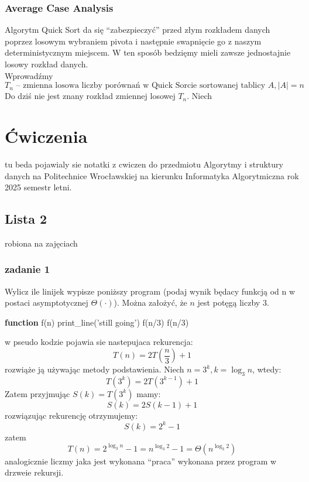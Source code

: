 \documentclass[11pt,a4paper]{article}
\begin{document}
\subsubsection{Average Case Analysis}
Algorytm Quick Sort da się ``zabezpieczyć'' przed złym rozkładem danych poprzez losowym wybraniem pivota i następnie swapnięcie go z naszym deterministycznym miejscem. W ten sposób bedzięmy mieli zawsze jednostajnie losowy rozkład danych.\\
Wprowadźmy
\[
    T_n  \text{ -- zmienna losowa liczby porównań w Quick Sorcie sortowanej tablicy } A, |A|=n
\]
Do dziś nie jest znany rozkład zmiennej losowej $T_n$.
Niech




\section{Ćwiczenia}
tu beda pojawialy sie notatki z cwiczen do przedmiotu Algorytmy i struktury danych na Politechnice Wrocławskiej na kierunku Informatyka Algorytmiczna rok 2025 semestr letni.

\subsection{Lista 2}
robiona na zajęciach \date{2025-03-10}
\subsubsection{zadanie 1}
Wylicz ile linijek wypisze poniższy program (podaj wynik będacy funkcją od n w postaci asymptotycznej $\Theta(\cdot)$). Można założyć, że $n$ jest potęgą liczby $3$.
\begin{algorithm}
\begin{algorithmic}[1]
\State \textbf{function} f(n)
    \State print\_line('still going')
    \State f(n/3)
    \State f(n/3)
\EndIf
\end{algorithmic}
\end{algorithm}
w pseudo kodzie pojawia sie nastepujaca rekurencja:
\[
    T(n) = 2T(\frac{n}{3}) + 1
\]
rozwiąże ją używając metody podstawienia. Niech $n=3^k, k = \log_3 n$, wtedy:
\[
    T(3^k) = 2T(3^{k-1}) + 1
\]
Zatem przyjmując $S(k) = T(3^k)$ mamy:
\[
    S(k) = 2S(k-1) + 1
\]
rozwiązując rekurencję otrzymujemy:
\[
    S(k) = 2^k - 1
\]
zatem
\[
    T(n) = 2^{\log_3 n} - 1 = n^{\log_3 2} - 1 = \Theta(n^{\log_3 2})
\]
analogicznie liczmy jaka jest wykonana ``praca'' wykonana przez program w drzweie rekursji.
\end{document}
